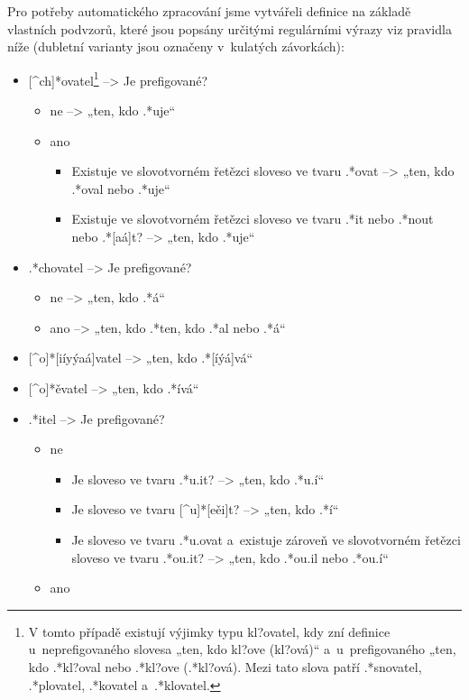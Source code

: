 Pro potřeby automatického zpracování jsme vytvářeli definice na základě
vlastních podvzorů, které jsou popsány určitými regulárními výrazy viz
pravidla níže (dubletní varianty jsou označeny v~kulatých závorkách):

\begin{itemize}
\tightlist
\item
  {[}\^{}ch{]}*ovatel\footnote{V tomto případě existují výjimky typu kl?ovatel, kdy zní definice u~neprefigovaného slovesa „ten, kdo kl?ove (kl?ová)“ a~u~prefigovaného „ten, kdo .*kl?oval nebo .*kl?ove (.*kl?ová). Mezi tato slova patří .*snovatel, .*plovatel, .*kovatel a~.*klovatel.}
  --\textgreater{} Je prefigované?

  \begin{itemize}
  \tightlist
  \item
    ne --\textgreater{} „ten, kdo .*uje``
  \item
    ano

    \begin{itemize}
    \tightlist
    \item
      Existuje ve slovotvorném řetězci sloveso ve tvaru .*ovat
      --\textgreater{} „ten, kdo .*oval nebo .*uje``
    \item
      Existuje ve slovotvorném řetězci sloveso ve tvaru .*it nebo .*nout
      nebo .*{[}aá{]}t? --\textgreater{} „ten, kdo .*uje``
    \end{itemize}
  \end{itemize}
\item
  .*chovatel --\textgreater{} Je prefigované?

  \begin{itemize}
  \tightlist
  \item
    ne --\textgreater{} „ten, kdo .*á``
  \item
    ano --\textgreater{} „ten, kdo .*ten, kdo .*al nebo .*á``
  \end{itemize}
\item
  {[}\^{}o{]}*{[}iíyýaá{]}vatel --\textgreater{} „ten, kdo
  .*{[}íýá{]}vá``
\item
  {[}\^{}o{]}*ěvatel --\textgreater{} „ten, kdo .*ívá``
\item
  .*itel --\textgreater{} Je prefigované?

  \begin{itemize}
  \tightlist
  \item
    ne

    \begin{itemize}
    \tightlist
    \item
      Je sloveso ve tvaru .*u.it? --\textgreater{} „ten, kdo .*u.í``
    \item
      Je sloveso ve tvaru {[}\^{}u{]}*{[}eěi{]}t? --\textgreater{} „ten,
      kdo .*í``
    \item
      Je sloveso ve tvaru .*u.ovat a~existuje zároveň ve slovotvorném
      řetězci sloveso ve tvaru .*ou.it? --\textgreater{} „ten, kdo
      .*ou.il nebo .*ou.í``
    \end{itemize}
  \item
    ano


\end{itemize}
\end{itemize}
